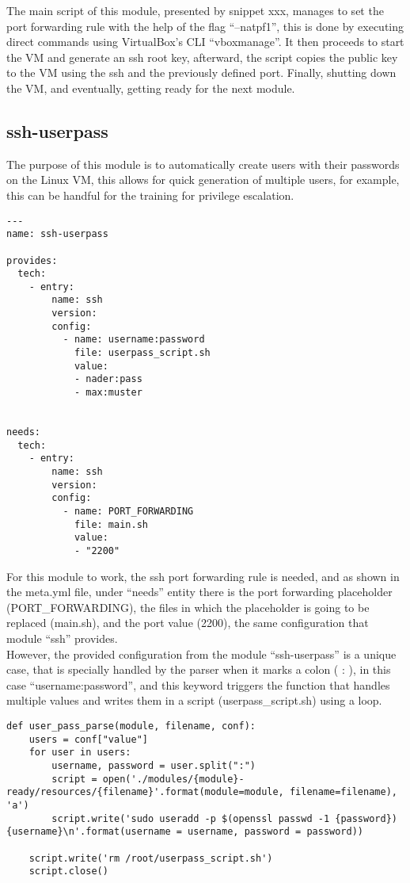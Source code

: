 The main script of this module, presented by snippet xxx, manages to set the port forwarding rule with the help of the flag “--natpf1”, this is done by executing direct commands using VirtualBox’s CLI “vboxmanage”. It then proceeds to start the VM and generate an ssh root key, afterward, the script copies the public key to the VM using the ssh and the previously defined port. Finally, shutting down the VM, and eventually, getting ready for the next module.
\clearpage

\subsection{ssh-userpass}
The purpose of this module is to automatically create users with their passwords on the Linux VM, this allows for quick generation of multiple users, for example, this can be handful for the training for privilege escalation.

\begin{lstlisting}[caption=ssh metadata, style=pythonstyle]
---
name: ssh-userpass

provides:
  tech:
    - entry:
        name: ssh
        version:
        config:
          - name: username:password
            file: userpass_script.sh
            value:
            - nader:pass
            - max:muster


needs:
  tech:
    - entry:
        name: ssh
        version:
        config:
          - name: PORT_FORWARDING
            file: main.sh
            value:
            - "2200"
\end{lstlisting}

For this module to work, the ssh port forwarding rule is needed, and as shown in the meta.yml file, under “needs” entity there is the port forwarding placeholder (PORT\_FORWARDING), the files in which the placeholder is going to be replaced (main.sh), and the port value (2200), the same configuration that module “ssh” provides.\\
However, the provided configuration from the module “ssh-userpass” is a unique case, that is specially handled by the parser when it marks a colon ( : ), in this case “username:password”, and this keyword triggers the function that handles multiple values and writes them in a script (userpass\_script.sh) using a loop.\\
\clearpage

\begin{lstlisting}[caption=ssh-userpass parsing, style=pythonstyle]
def user_pass_parse(module, filename, conf):
    users = conf["value"]
    for user in users:
        username, password = user.split(":")
        script = open('./modules/{module}-ready/resources/{filename}'.format(module=module, filename=filename), 'a')
        script.write('sudo useradd -p $(openssl passwd -1 {password}) {username}\n'.format(username = username, password = password))

    script.write('rm /root/userpass_script.sh')
    script.close()
\end{lstlisting}


